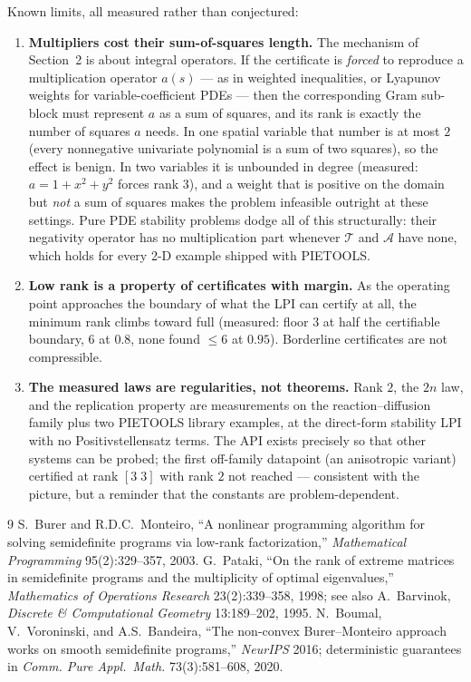 \documentclass[11pt]{article}
\newcommand{\T}{\mathcal{T}}
\newcommand{\A}{\mathcal{A}}
\begin{document}
Known limits, all measured rather than conjectured:
\begin{enumerate}
\item \textbf{Multipliers cost their sum-of-squares length.} The mechanism
      of Section~2 is about integral operators. If the certificate is
      \emph{forced} to reproduce a multiplication operator $a(s)$ --- as in
      weighted inequalities, or Lyapunov weights for variable-coefficient
      PDEs --- then the corresponding Gram sub-block must represent $a$ as a
      sum of squares, and its rank is exactly the number of squares $a$
      needs. In one spatial variable that number is at most $2$ (every
      nonnegative univariate polynomial is a sum of two squares), so the
      effect is benign. In two variables it is unbounded in degree
      (measured: $a=1+x^2+y^2$ forces rank $3$), and a weight that is
      positive on the domain but \emph{not} a sum of squares makes the
      problem infeasible outright at these settings. Pure PDE stability
      problems dodge all of this structurally: their negativity operator has
      no multiplication part whenever $\T$ and $\A$ have none, which holds
      for every 2-D example shipped with PIETOOLS.
\item \textbf{Low rank is a property of certificates with margin.} As the
      operating point approaches the boundary of what the LPI can certify at
      all, the minimum rank climbs toward full (measured: floor $3$ at half
      the certifiable boundary, $6$ at $0.8$, none found $\le 6$ at $0.95$).
      Borderline certificates are not compressible.
\item \textbf{The measured laws are regularities, not theorems.} Rank $2$,
      the $2n$ law, and the replication property are measurements on the
      reaction--diffusion family plus two PIETOOLS library examples, at the
      direct-form stability LPI with no Positivstellensatz terms. The API
      exists precisely so that other systems can be probed; the first
      off-family datapoint (an anisotropic variant) certified at rank
      $[3\;3]$ with rank $2$ not reached --- consistent with the picture,
      but a reminder that the constants are problem-dependent.
\end{enumerate}

\begin{thebibliography}{9}\small
{} S.~Burer and R.D.C.~Monteiro,
``A nonlinear programming algorithm for solving semidefinite programs via
low-rank factorization,'' \emph{Mathematical Programming} 95(2):329--357,
2003.
 G.~Pataki,
``On the rank of extreme matrices in semidefinite programs and the
multiplicity of optimal eigenvalues,'' \emph{Mathematics of Operations
Research} 23(2):339--358, 1998; see also A.~Barvinok, \emph{Discrete \&
Computational Geometry} 13:189--202, 1995.
 N.~Boumal, V.~Voroninski, and A.S.~Bandeira,
``The non-convex Burer--Monteiro approach works on smooth semidefinite
programs,'' \emph{NeurIPS} 2016; deterministic guarantees in \emph{Comm.
Pure Appl.\ Math.} 73(3):581--608, 2020.
\end{thebibliography}
\end{document}
